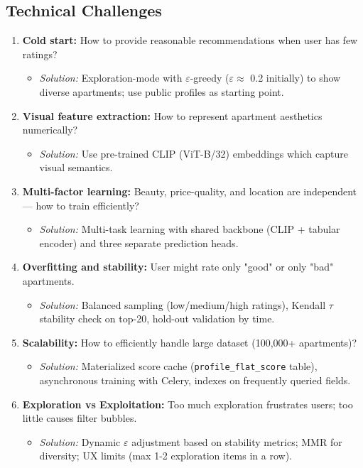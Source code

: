 \documentclass[12pt,a4paper]{article}
\begin{document}
\subsection{Technical Challenges}

\begin{enumerate}
    \item \textbf{Cold start:} How to provide reasonable recommendations when user has few ratings?
    \begin{itemize}
        \item \textit{Solution:} Exploration-mode with $\varepsilon$-greedy ($\varepsilon \approx$ 0.2 initially) to show diverse apartments; use public profiles as starting point.
    \end{itemize}
    
    \item \textbf{Visual feature extraction:} How to represent apartment aesthetics numerically?
    \begin{itemize}
        \item \textit{Solution:} Use pre-trained CLIP (ViT-B/32) embeddings which capture visual semantics.
    \end{itemize}
    
    \item \textbf{Multi-factor learning:} Beauty, price-quality, and location are independent — how to train efficiently?
    \begin{itemize}
        \item \textit{Solution:} Multi-task learning with shared backbone (CLIP + tabular encoder) and three separate prediction heads.
    \end{itemize}
    
    \item \textbf{Overfitting and stability:} User might rate only "good" or only "bad" apartments.
    \begin{itemize}
        \item \textit{Solution:} Balanced sampling (low/medium/high ratings), Kendall $\tau$ stability check on top-20, hold-out validation by time.
    \end{itemize}
    
    \item \textbf{Scalability:} How to efficiently handle large dataset (100,000+ apartments)?
    \begin{itemize}
        \item \textit{Solution:} Materialized score cache (\texttt{profile\_flat\_score} table), asynchronous training with Celery, indexes on frequently queried fields.
    \end{itemize}
    
    \item \textbf{Exploration vs Exploitation:} Too much exploration frustrates users; too little causes filter bubbles.
    \begin{itemize}
        \item \textit{Solution:} Dynamic $\varepsilon$ adjustment based on stability metrics; MMR for diversity; UX limits (max 1-2 exploration items in a row).
    \end{itemize}
\end{enumerate}
\end{document}
